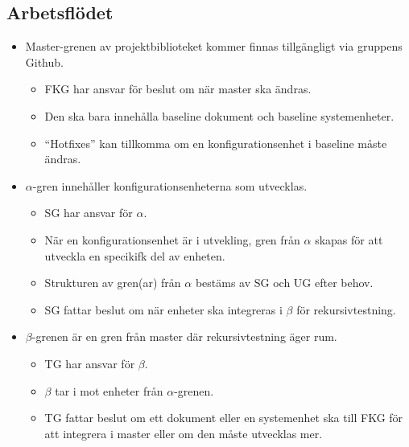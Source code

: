 \documentclass[paper=a4, fontsize=11pt,twoside]{article}
\begin{document}
\subsection*{Arbetsflödet}
\begin{itemize}

\item Master-grenen av projektbiblioteket kommer finnas tillgängligt via gruppens Github.
	\begin{itemize}
	\item FKG har ansvar för beslut om när master ska ändras.
	\item Den ska bara innehålla baseline dokument och baseline systemenheter.
	\item ``Hotfixes'' kan tillkomma om en konfigurationsenhet i baseline måste ändras.
	\end{itemize}

\item $\alpha$-gren innehåller konfigurationsenheterna som utvecklas.
	\begin{itemize}
	\item SG har ansvar för $\alpha$.
	\item När en konfigurationsenhet är i utvekling, gren från $\alpha$ skapas för
	att utveckla en specikifk del av enheten.
	\item Strukturen av gren(ar) från $\alpha$ bestäms av SG och UG efter behov.
	\item SG fattar beslut om när enheter ska integreras i $\beta$ för
	rekursivtestning. 
	\end{itemize}
	
\item $\beta$-grenen är en gren från master där rekursivtestning äger rum.
	\begin{itemize}
	\item TG har ansvar för $\beta$. 
	\item $\beta$ tar i mot enheter från $\alpha$-grenen. 
	\item TG fattar beslut om ett dokument eller en systemenhet ska till FKG för att integrera i master eller om den måste utvecklas mer. 
	\end{itemize}
	
\end{itemize}
\end{document}
